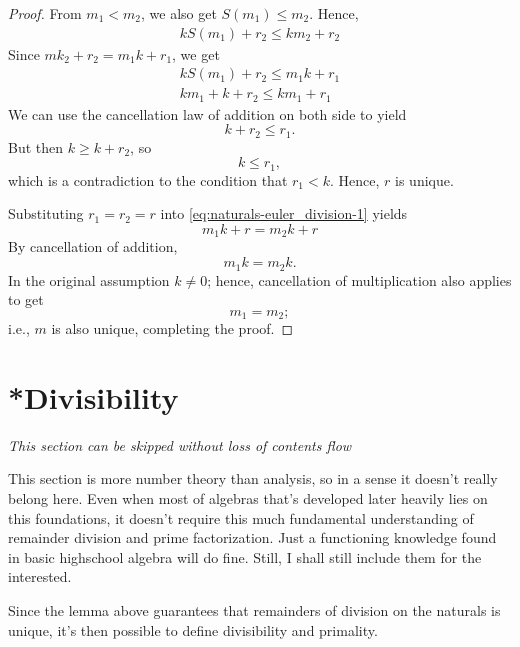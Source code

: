 \begin{proof}
  From \(m_1 < m_2\), we also get \(S(m_1) \leq m_2\). Hence,
  \begin{align}
    k S(m_1) + r_2 \leq k m_2 + r_2
  \end{align}
  Since \(m k_2 + r_2 = m_1 k + r_1\), we get
  \begin{align}
    k S(m_1) + r_2 \leq m_1 k + r_1  \\
    k m_1 + k + r_2 \leq k m_1 + r_1
  \end{align}
  We can use the cancellation law of addition on both side to yield
  \begin{equation}
    k + r_2 \leq r_1.
  \end{equation}
  But then \(k \geq k + r_2\), so
  \begin{equation}
    k \leq r_1,
  \end{equation}
  which is a contradiction to the condition that \(r_1 < k\). Hence, \(r\) is unique.

  Substituting \(r_1 = r_2 = r\) into \cref{eq:naturals-euler_division-1} yields
  \begin{equation}
    m_1 k + r = m_2 k + r
  \end{equation}
  By cancellation of addition,
  \begin{equation}
    m_1 k = m_2 k.
  \end{equation}
  In the original assumption \(k \neq 0\); hence, cancellation of multiplication also applies to get
  \begin{equation}
    m_1 = m_2;
  \end{equation}
  i.e., \(m\) is also unique, completing the proof.
\end{proof}

\section{*Divisibility}

\emph{This section can be skipped without loss of contents flow}

This section is more number theory than analysis, so in a sense it doesn't really belong here. Even
when most of algebras that's developed later heavily lies on this foundations, it doesn't require
this much fundamental understanding of remainder division and prime factorization. Just a
functioning knowledge found in basic highschool algebra will do fine. Still, I shall still include
them for the interested.

Since the lemma above guarantees that remainders of division on the naturals is unique, it's then
possible to define divisibility and primality.

